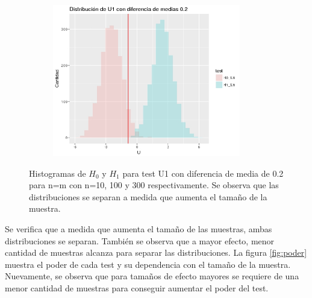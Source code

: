 \documentclass[%
 reprint,
 amsmath,amssymb,
 aps,
spanish]{revtex4-1}
\begin{document}
\begin{figure}[t]
\begin{subfigure}[t]{0.3\textwidth}
      \includegraphics[width=0.9\textwidth]{imagenes/histograma_U1_02_300}
    \end{subfigure}
    \label{fig:histogramas_poder_02}
    \caption{Histogramas de $H_0$ y $H_1$ para test U1 con diferencia de media de 0.2 para n=m con n=10, 100 y 300 respectivamente. Se observa que las distribuciones se separan a medida que aumenta 
el tamaño de la muestra.}
\end{figure}

Se verifica que a medida que aumenta el tamaño de las muestras, ambas distribuciones se separan. También se observa que a mayor efecto, menor cantidad de muestras alcanza para separar las 
distribuciones. La figura \ref{fig:poder} muestra el poder de cada test y su dependencia con el tamaño de la muestra. Nuevamente, se observa que para tamaños de efecto mayores se requiere de una menor 
cantidad de muestras para conseguir aumentar el poder del test.
\end{document}

